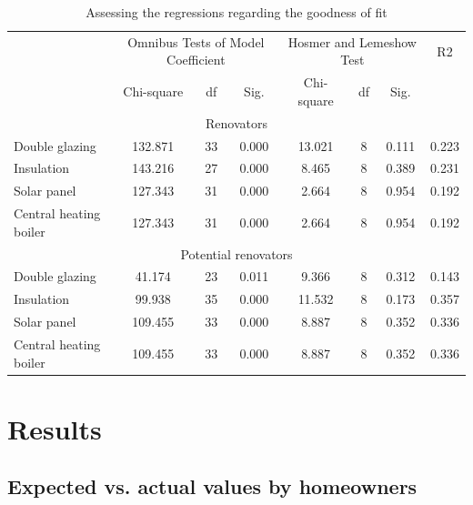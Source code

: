 \documentclass[preprint,12pt,3p]{elsarticle}
\begin{document}
\begin{table}[H]
  \centering
  \footnotesize
  \caption{Assessing the regressions regarding the goodness of fit}
    \begin{tabular}{p{5em}|c|c|c|c|c|c|c}
    \toprule
      & \multicolumn{3}{c|}{Omnibus Tests of Model Coefficient} & \multicolumn{3}{c|}{Hosmer and Lemeshow Test} & R2\\
\cmidrule{2-7}    
\multicolumn{1}{r|}{} & \multicolumn{1}{c|}{Chi-square} & \multicolumn{1}{c|}{df} & \multicolumn{1}{c|}{Sig.} & \multicolumn{1}{c|}{Chi-square} & \multicolumn{1}{c|}{df} & \multicolumn{1}{c|}{Sig.} &  \\
    \midrule
    \multicolumn{8}{c}{Renovators} \\
    \midrule
    Double glazing & 132.871 & 33    & 0.000 & 13.021 & 8     & 0.111 & 0.223 \\
    
    Insulation & 143.216 & 27     & 0.000 & 8.465 & 8     & 0.389 & 0.231 \\
    
    Solar panel & 127.343 & 31     & 0.000 & 2.664 & 8     & 0.954 & 0.192 \\
    Central heating boiler & 127.343 & 31     & 0.000 & 2.664 & 8     & 0.954 & 0.192\\  \midrule
    \multicolumn{8}{c}{Potential renovators} \\
    \midrule
    Double glazing & 41.174 & 23     & 0.011 & 9.366 & 8     & 0.312 & 0.143 \\

    Insulation & 99.938 & 35    & 0.000 & 11.532 & 8     & 0.173 & 0.357 \\
    
    Solar panel & 109.455 & 33     & 0.000 & 8.887 & 8     & 0.352 & 0.336 \\
    Central heating boiler & 109.455 & 33     & 0.000 & 8.887 & 8     & 0.352 & 0.336 \\
 
    \bottomrule
    \end{tabular}
  \label{tab:5}
\end{table}

\section{Results}

\subsection{Expected vs. actual values by homeowners}
\end{document}
